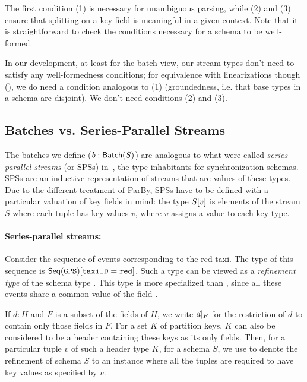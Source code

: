 The first condition (1) is necessary for unambiguous parsing, while (2) and (3)
ensure that splitting on a key field is meaningful in a given context.
Note that it is straightforward to check the conditions necessary for a schema to be well-formed.

In our development, at least for the batch view, our stream types don't need to satisfy any well-formedness conditions; for equivalence with linearizations though (), we do need a condition analogous to (1) (groundedness, i.e. that base types in a schema are disjoint). We don't need conditions (2) and (3).

\subsection{Batches vs. Series-Parallel Streams}

The batches we define ($\batchtype{b}{S}$) are analogous to what were called
\emph{series-parallel streams} (or SPSs) in~, the type inhabitants for synchronization schemas.
SPSs are an inductive representation of streams that are values of these types.
Due to the different treatment of ParBy,
SPSs have to be defined with a particular valuation of key fields in mind: the type $\spstype{v}{S}$ is elements of the stream $S$ where each tuple has key values $v$, where $v$ assigns a value to each key type.

\paragraph{Series-parallel streams:} Consider the sequence of  events corresponding
to the red taxi. The type of this sequence is $\spstype{\code{taxiID}=\code{red}}{\seqleaf{\code{GPS}}}$. Such a type can
be viewed as a \emph{refinement type} of the schema type .
This type is more specialized than ,
since all these events share a common value of the field .

If $d : H$ and $F$ is a subset of the fields of $H$, we write $\tuprestrict{d}{F}$ for
the restriction of $d$ to contain only those fields in $F$.
For a set $K$ of partition keys, $K$ can also be considered to be a header containing these keys as its only fields.
Then, for a particular tuple $v$ of such a header type $K$, for a schema $S$, we use
 to denote the refinement of schema $S$ to an instance where all the tuples
are required to have key values as specified by $v$.

